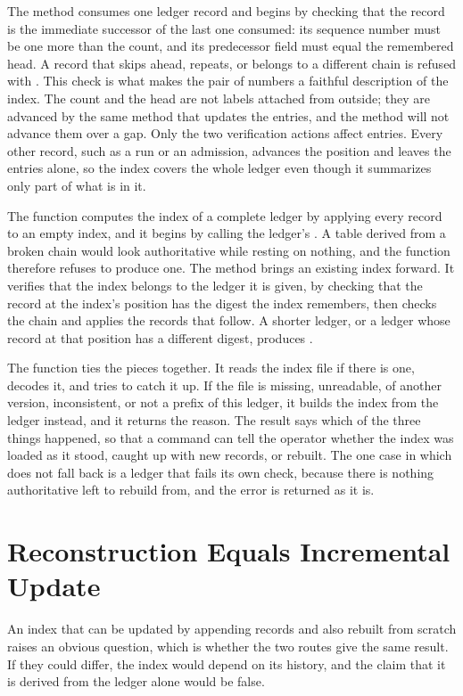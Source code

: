 The method  consumes one ledger record and begins by checking that the record is the immediate successor of the last one consumed: its sequence number must be one more than the count, and its predecessor field must equal the remembered head. A record that skips ahead, repeats, or belongs to a different chain is refused with . This check is what makes the pair of numbers a faithful description of the index. The count and the head are not labels attached from outside; they are advanced by the same method that updates the entries, and the method will not advance them over a gap. Only the two verification actions affect entries. Every other record, such as a run or an admission, advances the position and leaves the entries alone, so the index covers the whole ledger even though it summarizes only part of what is in it.

The function  computes the index of a complete ledger by applying every record to an empty index, and it begins by calling the ledger's . A table derived from a broken chain would look authoritative while resting on nothing, and the function therefore refuses to produce one. The method  brings an existing index forward. It verifies that the index belongs to the ledger it is given, by checking that the record at the index's position has the digest the index remembers, then checks the chain and applies the records that follow. A shorter ledger, or a ledger whose record at that position has a different digest, produces .

The function  ties the pieces together. It reads the index file if there is one, decodes it, and tries to catch it up. If the file is missing, unreadable, of another version, inconsistent, or not a prefix of this ledger, it builds the index from the ledger instead, and it returns the reason. The result says which of the three things happened, so that a command can tell the operator whether the index was loaded as it stood, caught up with new records, or rebuilt. The one case in which  does not fall back is a ledger that fails its own check, because there is nothing authoritative left to rebuild from, and the error is returned as it is.

\section{Reconstruction Equals Incremental Update}

An index that can be updated by appending records and also rebuilt from scratch raises an obvious question, which is whether the two routes give the same result. If they could differ, the index would depend on its history, and the claim that it is derived from the ledger alone would be false.


